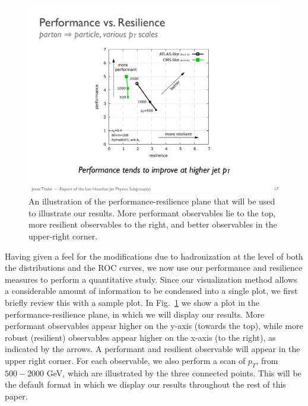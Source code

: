 \documentclass[11pt,letterpaper]{article}
\DeclareRobustCommand{\Fig}[1]{Fig.~\ref{#1}}
\begin{document}
\begin{figure}
\begin{center}
\includegraphics[width=0.4\columnwidth]{figures/sweep_pt}
\end{center}
\caption{An illustration of the performance-resilience plane that will be used to illustrate our results. More performant observables lie to the top, more resilient observables to the right, and better observables in the upper-right corner.}
\label{fig:sweep_pt}
\end{figure}



Having given a feel for the modifications due to hadronization at the level of both the distributions and the ROC curves, we now use our performance and resilience measures to perform a quantitative study. Since our visualization method allows a considerable amount of information to be condensed into a single plot, we first briefly review this with a sample plot. In \Fig{fig:sweep_pt} we show a plot in the performance-resilience plane, in which we will display our results. More performant observables appear higher on the y-axis (towards the top), while more robust (resilient) observables appear higher on the x-axis (to the right), as indicated by the arrows. A performant and resilient observable will appear in the upper right corner. For each observable, we also perform a scan of $p_T$, from $500-2000$ GeV, which are illustrated by the three connected points. This will be the default format in which we display our results throughout the rest of this paper.
\end{document}
